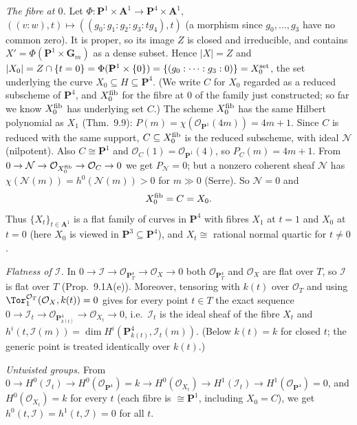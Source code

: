 \documentclass[11pt]{article}
\begin{document}
\emph{The fibre at $0$.} Let $\Phi\colon\mathbf P^1\times\mathbf A^1\to\mathbf P^4\times\mathbf A^1$, $((v:w),t)\mapsto((g_0:g_1:g_2:g_3:tg_4),t)$ (a morphism since $g_0,\dots,g_3$ have no common zero). It is proper, so its image $Z$ is closed and irreducible, and contains $X'=\Phi(\mathbf P^1\times\mathbf G_m)$ as a dense subset. Hence $|X|=Z$ and $|X_0|=Z\cap\{t=0\}=\Phi(\mathbf P^1\times\{0\})=\{(g_0:\dots:g_3:0)\}=X_0^{\rm set}$, the set underlying the curve $X_0\subseteq H\subseteq\mathbf P^4$. (We write $C$ for $X_0$ regarded as a reduced subscheme of $\mathbf P^4$, and $X^{\rm fib}_0$ for the fibre at $0$ of the family just constructed; so far we know $X_0^{\rm fib}$ has underlying set $C$.) The scheme $X^{\rm fib}_0$ has the same Hilbert polynomial as $X_1$ (Thm.~9.9): $P(m)=\chi(\mathcal O_{\mathbf P^1}(4m))=4m+1$. Since $C$ is reduced with the same support, $C\subseteq X_0^{\rm fib}$ is the reduced subscheme, with ideal $\mathcal N$ (nilpotent). Also $C\cong\mathbf P^1$ and $\mathcal O_C(1)=\mathcal O_{\mathbf P^1}(4)$, so $P_C(m)=4m+1$. From $0\to\mathcal N\to\mathcal O_{X_0^{\rm fib}}\to\mathcal O_C\to0$ we get $P_{\mathcal N}=0$; but a nonzero coherent sheaf $\mathcal N$ has $\chi(\mathcal N(m))=h^0(\mathcal N(m))>0$ for $m\gg0$ (Serre). So $\mathcal N=0$ and
\[
X_0^{\rm fib}=C=X_0 .
\]
Thus $\{X_t\}_{t\in\mathbf A^1}$ is a flat family of curves in $\mathbf P^4$ with fibres $X_1$ at $t=1$ and $X_0$ at $t=0$ (here $X_0$ is viewed in $\mathbf P^3\subseteq\mathbf P^4$), and $X_t\cong$ rational normal quartic for $t\ne0$.

\emph{Flatness of $\mathcal I$.} In $0\to\mathcal I\to\mathcal O_{\mathbf P^4_T}\to\mathcal O_X\to0$ both $\mathcal O_{\mathbf P^4_T}$ and $\mathcal O_X$ are flat over $T$, so $\mathcal I$ is flat over $T$ (Prop.~9.1A(e)). Moreover, tensoring with $k(t)$ over $\mathcal O_T$ and using $\Tor_1^{\mathcal O_T}(\mathcal O_X,k(t))=0$ gives for every point $t\in T$ the exact sequence $0\to\mathcal I_t\to\mathcal O_{\mathbf P^4_{k(t)}}\to\mathcal O_{X_t}\to0$, i.e.\ $\mathcal I_t$ is the ideal sheaf of the fibre $X_t$ and $h^i(t,\mathcal I(m))=\dim H^i(\mathbf P^4_{k(t)},\mathcal I_t(m))$. (Below $k(t)=k$ for closed $t$; the generic point is treated identically over $k(t)$.)

\emph{Untwisted groups.} From $0\to H^0(\mathcal I_t)\to H^0(\mathcal O_{\mathbf P^4})=k\to H^0(\mathcal O_{X_t})\to H^1(\mathcal I_t)\to H^1(\mathcal O_{\mathbf P^4})=0$, and $H^0(\mathcal O_{X_t})=k$ for every $t$ (each fibre is $\cong\mathbf P^1$, including $X_0=C$), we get $h^0(t,\mathcal I)=h^1(t,\mathcal I)=0$ for all $t$.
\end{document}
